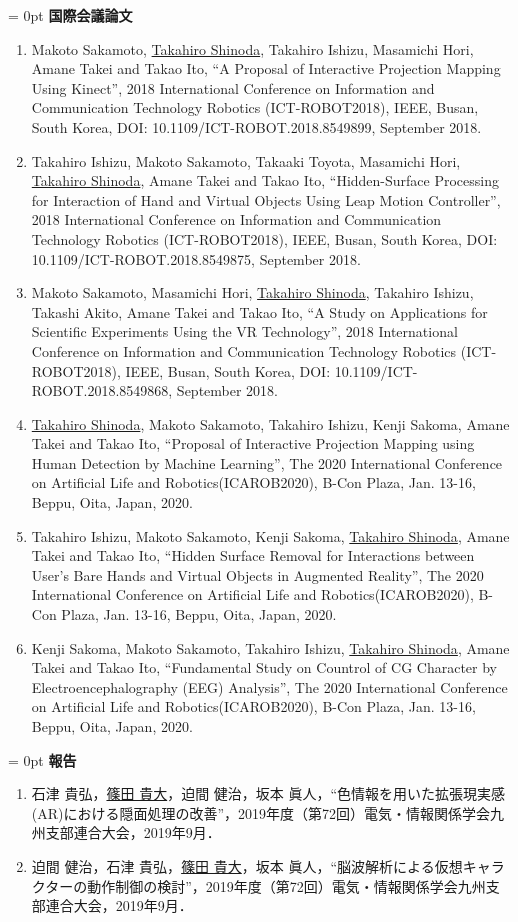 \parindent = 0pt
{\Large \bf 国際会議論文}
\begin{enumerate}[1.]
    \item Makoto Sakamoto, \underline{Takahiro Shinoda}, Takahiro Ishizu, Masamichi Hori, Amane Takei and  Takao Ito, ``A Proposal of Interactive Projection Mapping Using Kinect'', 2018 International Conference on Information and Communication Technology Robotics (ICT-ROBOT2018), IEEE, Busan, South Korea, DOI: 10.1109/ICT-ROBOT.2018.8549899, September 2018.
    \item Takahiro Ishizu, Makoto Sakamoto, Takaaki Toyota, Masamichi Hori, \underline{Takahiro Shinoda}, Amane Takei and Takao Ito, ``Hidden-Surface Processing for Interaction of Hand and Virtual Objects Using Leap Motion Controller'', 2018 International Conference on Information and Communication Technology Robotics (ICT-ROBOT2018), IEEE, Busan, South Korea, DOI: 10.1109/ICT-ROBOT.2018.8549875, September 2018.
    \item Makoto Sakamoto, Masamichi Hori, \underline{Takahiro Shinoda}, Takahiro Ishizu, Takashi Akito, Amane Takei and Takao Ito, ``A Study on Applications for Scientific Experiments Using the VR Technology'', 2018 International Conference on Information and Communication Technology Robotics (ICT-ROBOT2018), IEEE, Busan, South Korea, DOI: 10.1109/ICT-ROBOT.2018.8549868, September 2018.
    \item \underline{Takahiro Shinoda}, Makoto Sakamoto, Takahiro Ishizu,  Kenji Sakoma, Amane Takei and Takao Ito, ``Proposal of Interactive Projection Mapping using Human Detection by Machine Learning'', The 2020 International Conference on Artificial Life and Robotics(ICAROB2020), B-Con Plaza, Jan. 13-16, Beppu, Oita, Japan, 2020.
    \item Takahiro Ishizu, Makoto Sakamoto, Kenji Sakoma, \underline{Takahiro Shinoda}, Amane Takei and Takao Ito, ``Hidden Surface Removal for Interactions between User’s Bare Hands and Virtual Objects in Augmented Reality'', The 2020 International Conference on Artificial Life and Robotics(ICAROB2020), B-Con Plaza, Jan. 13-16, Beppu, Oita, Japan, 2020.
    \item Kenji Sakoma, Makoto Sakamoto, Takahiro Ishizu, \underline{Takahiro Shinoda}, Amane Takei and Takao Ito, ``Fundamental Study on Countrol of CG Character by Electroencephalography (EEG) Analysis'', The 2020 International Conference on Artificial Life and Robotics(ICAROB2020), B-Con Plaza, Jan. 13-16, Beppu, Oita, Japan, 2020.
\end{enumerate}

\vspace{10pt}

\parindent = 0pt
{\Large \bf 報告}
\begin{enumerate}[1.]
     \item 石津 貴弘，\underline{篠田 貴大}，迫間 健治，坂本 眞人，``色情報を用いた拡張現実感(AR)における隠面処理の改善''，2019年度（第72回）電気・情報関係学会九州支部連合大会，2019年9月．
     \item 迫間 健治，石津 貴弘，\underline{篠田 貴大}，坂本 眞人，``脳波解析による仮想キャラクターの動作制御の検討''，2019年度（第72回）電気・情報関係学会九州支部連合大会，2019年9月．   
\end{enumerate}